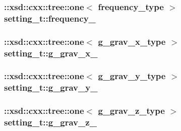 \subsubsection[{\texorpdfstring{frequency\+\_\+}{frequency_}}]{\setlength{\rightskip}{0pt plus 5cm}\+::xsd\+::cxx\+::tree\+::one$<$ {\bf frequency\+\_\+type} $>$ setting\+\_\+t\+::frequency\+\_\+\hspace{0.3cm}{\ttfamily [protected]}}\hypertarget{classsetting__t_acc63e2284b740c746bdf1dab028b858a}{}\label{classsetting__t_acc63e2284b740c746bdf1dab028b858a}
\subsubsection[{\texorpdfstring{g\+\_\+grav\+\_\+x\+\_\+}{g_grav_x_}}]{\setlength{\rightskip}{0pt plus 5cm}\+::xsd\+::cxx\+::tree\+::one$<$ {\bf g\+\_\+grav\+\_\+x\+\_\+type} $>$ setting\+\_\+t\+::g\+\_\+grav\+\_\+x\+\_\+\hspace{0.3cm}{\ttfamily [protected]}}\hypertarget{classsetting__t_a2cdb29eafe8ba71597e86ef6383cc668}{}\label{classsetting__t_a2cdb29eafe8ba71597e86ef6383cc668}
\subsubsection[{\texorpdfstring{g\+\_\+grav\+\_\+y\+\_\+}{g_grav_y_}}]{\setlength{\rightskip}{0pt plus 5cm}\+::xsd\+::cxx\+::tree\+::one$<$ {\bf g\+\_\+grav\+\_\+y\+\_\+type} $>$ setting\+\_\+t\+::g\+\_\+grav\+\_\+y\+\_\+\hspace{0.3cm}{\ttfamily [protected]}}\hypertarget{classsetting__t_a461b25a23d03b78499a0eb68ba22ebd4}{}\label{classsetting__t_a461b25a23d03b78499a0eb68ba22ebd4}
\subsubsection[{\texorpdfstring{g\+\_\+grav\+\_\+z\+\_\+}{g_grav_z_}}]{\setlength{\rightskip}{0pt plus 5cm}\+::xsd\+::cxx\+::tree\+::one$<$ {\bf g\+\_\+grav\+\_\+z\+\_\+type} $>$ setting\+\_\+t\+::g\+\_\+grav\+\_\+z\+\_\+\hspace{0.3cm}{\ttfamily [protected]}}\hypertarget{classsetting__t_a52a66734fe5e30d21e9a5efd6fdeb021}{}\label{classsetting__t_a52a66734fe5e30d21e9a5efd6fdeb021}
